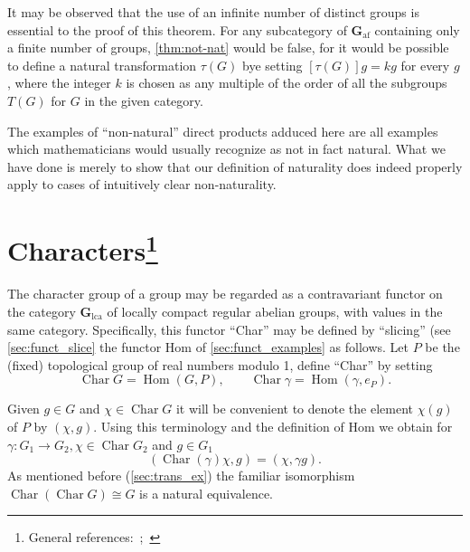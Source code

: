 \documentclass[11pt,a4paper]{report}
\DeclareMathOperator{\hm}{Hom}
\DeclareMathOperator{\chr}{Char}
\begin{document}
It may be observed that the use of an infinite number of distinct groups is essential to the proof of this theorem.
For any subcategory of $\mathbf{G}_\text{af}$ containing only a finite number of groups, \cref{thm:not-nat} would be
false, for it would be possible to define a natural transformation $\tau(G)$ bye setting $[\tau(G)]g=kg$ for
every $g$, where the integer $k$ is chosen as any multiple of the order of all the subgroups $T(G)$ for $G$ in the 
given category.

The examples of ``non\hyp{}natural'' direct products adduced here are all examples which mathematicians would usually
recognize as not in fact natural. What we have done is merely to show that our definition of naturality does indeed
properly apply to cases of intuitively clear non\hyp{}naturality.

\section[Characters]{Characters\footnote{General references:~\cite[chap.1]{weil1938};~\cite[chap.2]{lef1942}}}\label{sec:char}
The character group of a group may be regarded as a contravariant functor on the category $\mathbf{G}_\text{lca}$ of 
locally compact regular abelian groups, with values in the same category. Specifically, this functor ``Char'' may be
defined by ``slicing'' (see \cref{sec:funct_slice} the functor Hom of \cref{sec:funct_examples} as follows.
Let $P$ be the (fixed) topological group of real numbers modulo 1, define ``Char'' by setting
\begin{equation}\label{eq:character}
	\chr G =\hm(G,P),\qquad \chr\gamma=\hm(\gamma,e_P).
\end{equation}

Given $g\in G$ and $\chi\in\chr G$ it will be convenient to denote the element $\chi(g)$ of $P$ by $(\chi,g)$. Using
this terminology and the definition of Hom we obtain for $\gamma:G_1\rightarrow G_2, \chi\in\chr G_2$ and $g\in G_1$
\begin{equation}\label{eq:character2}
	(\chr(\gamma)\chi,g)=(\chi,\gamma g).
\end{equation}
As mentioned before (\cref{sec:trans_ex}) the familiar isomorphism $\chr(\chr G)\cong G$ is a natural equivalence.
\end{document}
